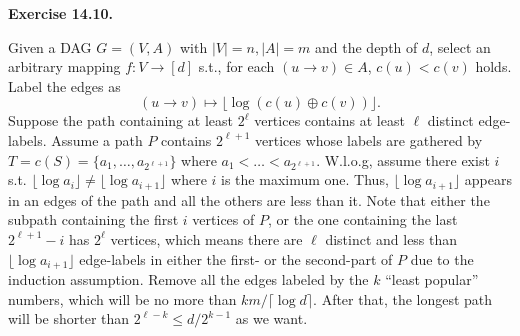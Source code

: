 \documentclass[a4paper]{article}
\newenvironment{exercise}[1]{
	\par
	\noindent\textbf{Exercise #1.}\quad
}{
	\par
	\bigskip
}
\begin{document}
    \begin{exercise}{14.10}
        Given a DAG $G = (V, A)$ with $|V| = n, |A| = m$ and the depth of $d$, select an arbitrary mapping $f: V \to [d]$ s.t., for each $(u \to v) \in A$, $c(u) < c(v)$ holds. Label the edges as 
        \[
           (u \to v) \mapsto \lfloor \log(c(u)\oplus c(v))\rfloor.
        \]
        Suppose the path containing at least $2^\ell$ vertices contains at least $\ell$ distinct edge-labels. Assume a path $P$ contains $2^{\ell + 1}$ vertices whose labels are gathered by $T = c(S) = \{a_1, \ldots, a_{2^{\ell + 1}}\}$ where $a_1 < \ldots < a_{2^{\ell + 1}}$. W.l.o.g, assume there exist $i$ s.t. $\lfloor\log a_i\rfloor \neq \lfloor\log a_{i + 1}\rfloor$ where $i$ is the maximum one. Thus, $\lfloor \log a_{i + 1}\rfloor$ appears in an edges of the path and all the others are less than it. Note that either the subpath containing the first $i$ vertices of $P$, or the one containing the last $2^{\ell + 1} - i$ has $2^{\ell}$ vertices, which means there are $\ell$ distinct and less than $\lfloor \log a_{i + 1}\rfloor$ edge-labels in either the first- or the second-part of $P$ due to the induction assumption. Remove all the edges labeled by the $k$ ``least popular'' numbers, which will be no more than $km/\lceil\log d\rceil$. After that, the longest path will be shorter than $2^{\ell - k} \leq d/2^{k - 1}$ as we want.
    \end{exercise}
\end{document}

